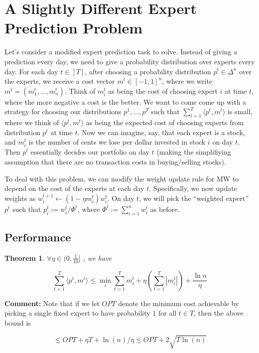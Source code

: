 \documentclass[11pt]{article}
\newtheorem{theorem}{Theorem}
\begin{document}
\section{A Slightly Different Expert Prediction Problem}

Let's consider a modified expert prediction task to solve. Instead of giving a prediction every day, we need to give a probability distribution over experts every day. For each day $t \in [T]$, after choosing a probability distribution $p^t \in \Delta^n$ over the experts, we receive  a cost vector $m^{t} \in [-1,1]^n$, where we write $m^t=(m_1^t,...,m_n^t)$. Think of $m_i^t$ as being the cost of choosing expert $i$ at time $t$, where the more negative a cost is the better. We want to come come up with a strategy for choosing our distributions $p^1,...,p^T$ such that $\sum_{t=1}^T \langle p^t , m^t \rangle$ is small, where we think of $\langle p^t , m^t \rangle$ as being the expected cost of choosing experts from distribution $p^t$ at time $t$. Now we can imagine, say, that each expert is a stock, and $m_i^t$ is the number of cents we lose per dollar invested in stock $i$ on day $t$. Then $p^t$ essentially decides our portfolio on day $t$ (making the simplifiying assumption that there are no transaction costs in buying/selling stocks).

To deal with this problem, we can modify the weight update rule for MW to depend on the cost of the experts at each day $t$. Specifically, we now update weights as $w_i^{t+1} \leftarrow (1-\eta m_{i}^t )w_i^t$. On day $t$, we will pick the ``weighted expert'' $p^t$ such that $p_i^t:=w_i^t/\Phi^t$, where $\Phi^t:=\sum_{i=1}^n w_i^t$ as before. 

\subsection{Performance}

\begin{theorem} $\forall \eta \in (0,\frac{1}{10}]$ , we have 

$$\sum_{t=1}^T \langle p^t, m^t \rangle \leq \min_{i} \sum_{t=1}^T m_i^t+\eta(\sum_{t=1}^T |m_i^t|) +\frac{\ln n}{\eta}$$

\end{theorem}

\textbf{Comment:} Note that if we let $OPT$ denote the minimum cost achievable by picking a single fixed expert to have probability $1$ for all $t \in T$, then the above bound is 

$$\leq OPT+\eta T+\ln(n)/\eta \leq OPT +2\sqrt{T \ln(n)}$$ 
\end{document}
